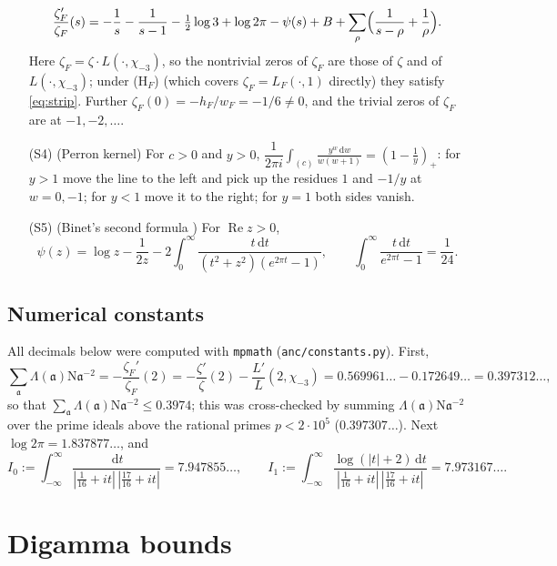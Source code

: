 \documentclass[11pt]{article}
\theoremstyle{definition}
\theoremstyle{remark}
\numberwithin{equation}{section}
\newcommand{\fa}{\mathfrak a}
\newcommand{\Nm}{\mathrm N}
\newcommand{\Rea}{\operatorname{Re}}
\newcommand{\dd}{\,\mathrm{d}}
\newcommand{\pos}[1]{\left(#1\right)_+}
\newcommand{\HF}{\textup{(H$_F$)}}
\begin{document}
\begin{enumerate}
\begin{equation}\label{eq:hadamardF}
 \frac{\zeta_F'}{\zeta_F}(s)=-\frac1s-\frac1{s-1}-\tfrac12\log3+\log2\pi-\psi(s)+B+\sum_\rho\Bigl(\frac1{s-\rho}+\frac1\rho\Bigr).
\end{equation}
Here $\zeta_F=\zeta\cdot L(\cdot,\chi_{-3})$, so the nontrivial zeros of $\zeta_F$ are those of $\zeta$ and of $L(\cdot,\chi_{-3})$; under \HF{} (which covers $\zeta_F=L_F(\cdot,1)$ directly) they satisfy \eqref{eq:strip}. Further $\zeta_F(0)=-h_F/w_F=-1/6\ne0$, and the trivial zeros of $\zeta_F$ are at $-1,-2,\ldots$.
\item[(S4)] (Perron kernel) For $c>0$ and $y>0$, $\dfrac1{2\pi i}\displaystyle\int_{(c)}\frac{y^{w}\dd w}{w(w+1)}=\pos{1-\frac1y}$: for $y>1$ move the line to the left and pick up the residues $1$ and $-1/y$ at $w=0,-1$; for $y<1$ move it to the right; for $y=1$ both sides vanish.
\item[(S5)] (Binet's second formula \cite[\S5.9]{dlmf}) For $\Rea z>0$,
\begin{equation}\label{eq:binet}
 \psi(z)=\log z-\frac1{2z}-2\int_0^\infty\frac{t\dd t}{(t^2+z^2)(e^{2\pi t}-1)},\qquad\int_0^\infty\frac{t\dd t}{e^{2\pi t}-1}=\frac1{24}.
\end{equation}
\end{enumerate}

\subsection{Numerical constants}\label{sec:constants}
All decimals below were computed with \texttt{mpmath} (\texttt{anc/constants.py}). First,
\begin{equation}\label{eq:zF2}
 \sum_\fa\Lambda(\fa)\Nm\fa^{-2}=-\frac{\zeta_F'}{\zeta_F}(2)=-\frac{\zeta'}{\zeta}(2)-\frac{L'}{L}(2,\chi_{-3})=0.569961\ldots-0.172649\ldots=0.397312\ldots,
\end{equation}
so that $\sum_\fa\Lambda(\fa)\Nm\fa^{-2}\le0.3974$; this was cross-checked by summing $\Lambda(\fa)\Nm\fa^{-2}$ over the prime ideals above the rational primes $p<2\cdot10^5$ ($0.397307\ldots$). Next $\log2\pi=1.837877\ldots$, and
\begin{equation}\label{eq:I0I1}
 I_0:=\int_{-\infty}^\infty\frac{\dd t}{|\tfrac1{16}+it|\,|\tfrac{17}{16}+it|}=7.947855\ldots,\qquad
 I_1:=\int_{-\infty}^\infty\frac{\log(|t|+2)\dd t}{|\tfrac1{16}+it|\,|\tfrac{17}{16}+it|}=7.973167\ldots .
\end{equation}

\section{Digamma bounds}\label{sec:digamma}
\end{document}
